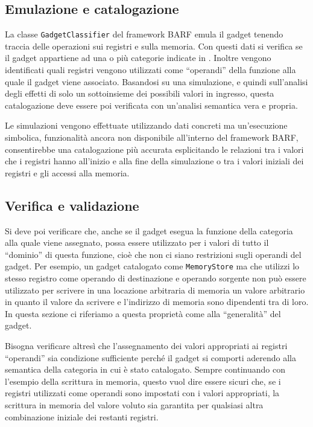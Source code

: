 \subsection{Emulazione e catalogazione}
La classe \lstinline{GadgetClassifier} del framework BARF emula il
gadget tenendo traccia delle operazioni sui registri e sulla
memoria. Con questi dati si verifica se il gadget appartiene ad una o
più categorie indicate in \cite{schwartz-2011}.
Inoltre vengono identificati quali registri vengono utilizzati come
``operandi'' della funzione alla quale il gadget viene
associato. Basandosi su una simulazione, e quindi sull'analisi degli
effetti di solo un sottoinsieme dei possibili valori in ingresso,
questa catalogazione deve essere poi verificata con un'analisi
semantica vera e propria.

Le simulazioni vengono effettuate utilizzando dati concreti ma
un'esecuzione simbolica, funzionalità ancora non disponibile
all'interno del framework BARF, consentirebbe una catalogazione più
accurata esplicitando le relazioni tra i valori che i registri hanno
all'inizio e alla fine della simulazione o tra i valori iniziali dei
registri e gli accessi alla memoria.

\subsection{Verifica e validazione}
\label{sec:verifica_validazione}

Si deve poi verificare che, anche se il gadget esegua la funzione
della categoria alla quale viene assegnato, possa essere utilizzato
per i valori di tutto il ``dominio'' di questa funzione, cioè che non
ci siano restrizioni sugli operandi del gadget. Per esempio, un gadget
catalogato come \lstinline{MemoryStore} ma che utilizzi lo stesso
registro come operando di destinazione e operando sorgente non può
essere utilizzato per scrivere in una locazione arbitraria di memoria
un valore arbitrario in quanto il valore da scrivere e l'indirizzo di
memoria sono dipendenti tra di loro. In questa sezione ci riferiamo a
questa proprietà come alla ``generalità'' del gadget.

Bisogna verificare altresì che l'assegnamento dei valori appropriati
ai registri ``operandi'' sia condizione sufficiente perché il gadget
si comporti aderendo alla semantica della categoria in cui è stato
catalogato. Sempre continuando con l'esempio della scrittura in
memoria, questo vuol dire essere sicuri che, se i registri utilizzati
come operandi sono impostati con i valori appropriati, la scrittura in
memoria del valore voluto sia garantita per qualsiasi altra
combinazione iniziale dei restanti registri.


